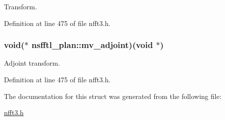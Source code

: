 Transform. 



Definition at line 475 of file nfft3.\-h.

\hypertarget{structnsfftl__plan_a658b4a71ff29aa1cc2febc66d6c175bd}{
\subsubsection[{mv\-\_\-adjoint}]{\setlength{\rightskip}{0pt plus 5cm}void($\ast$ nsfftl\-\_\-plan\-::mv\-\_\-adjoint)(void $\ast$)}}\label{structnsfftl__plan_a658b4a71ff29aa1cc2febc66d6c175bd}


Adjoint transform. 



Definition at line 475 of file nfft3.\-h.



The documentation for this struct was generated from the following file\-:\begin{DoxyCompactItemize}
\item 
\hyperlink{nfft3_8h}{nfft3.\-h}\end{DoxyCompactItemize}
